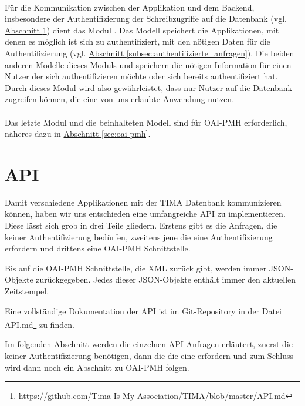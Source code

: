 \paragraph{} Für die Kommunikation zwischen der Applikation und dem Backend, insbesondere der Authentifizierung der Schreibzugriffe auf die Datenbank (vgl. \hyperref[sec:api]{Abschnitt \ref*{sec:api}}) dient das Modul . Das Modell  speichert die Applikationen, mit denen es möglich ist sich zu authentifiziert, mit den nötigen Daten für die Authentifizierung (vgl. \hyperref[subsec:authentifizierte_anfragen]{Abschnitt \ref*{subsec:authentifizierte_anfragen}}). Die beiden anderen Modelle dieses Moduls  und  speichern die nötigen Information für einen Nutzer der sich authentifizieren möchte oder sich bereits authentifiziert hat. Durch dieses Modul wird also gewährleistet, dass nur Nutzer auf die Datenbank zugreifen können, die eine von uns erlaubte Anwendung nutzen.

\paragraph{} Das letzte Modul und die beinhalteten Modell sind für OAI-PMH erforderlich, näheres dazu in \hyperref[sec:oai-pmh]{Abschnitt \ref*{sec:oai-pmh}}.


\section{API}\label{sec:api}
Damit verschiedene Applikationen mit der TIMA Datenbank kommunizieren können, haben
wir uns entschieden eine umfangreiche API zu implementieren. Diese lässt sich
grob in drei Teile gliedern. Erstens gibt es die Anfragen, die keiner
Authentifizierung bedürfen, zweitens jene die eine Authentifizierung erfordern und
drittens eine OAI-PMH Schnittstelle.

Bis auf die OAI-PMH Schnittstelle, die XML zurück gibt, werden immer JSON-Objekte zurückgegeben. Jedes dieser JSON-Objekte enthält immer den aktuellen Zeitstempel.

Eine vollständige Dokumentation der API ist im Git-Repository in der Datei API.md\footnote{\url{https://github.com/Tima-Is-My-Association/TIMA/blob/master/API.md}} zu finden.

Im folgenden Abschnitt werden die einzelnen API Anfragen erläutert, zuerst die keiner Authentifizierung benötigen, dann die die eine erfordern und zum Schluss wird dann noch ein Abschnitt zu OAI-PMH folgen.

